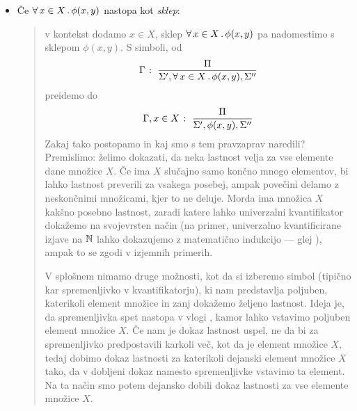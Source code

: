 \begin{itemize}
\begin{itemize}
\begin{quote}
					\end{quote}
				\item
					Če $\xall{x}[X]{\phi(x, y)}$ nastopa kot \emph{sklep}:
					\begin{quote}
						v kontekst dodamo $x \in X$, sklep $\xall{x}[X]{\phi(x, y)}$ pa nadomestimo s sklepom $\phi(x, y)$. S simboli, od
						\[\claim{\Gamma}{\Pi}{\Sigma', \xall{x}[X]{\phi(x, y)}, \Sigma''}\]
						preidemo do
						\[{\Gamma, x \in X} \;\colon\; \frac{\Pi}{\Sigma', \phi(x, y), \Sigma''}\]
						Zakaj tako postopamo in kaj smo s tem pravzaprav naredili? Premislimo: želimo dokazati, da neka lastnost velja za vse elemente dane množice $X$. Če ima $X$ slučajno samo končno mnogo elementov, bi lahko lastnost preverili za vsakega posebej, ampak povečini delamo z neskončnimi množicami, kjer to ne deluje. Morda ima množica $X$ kakšno posebno lastnost, zaradi katere lahko univerzalni kvantifikator dokažemo na svojevrsten način (na primer, univerzalno kvantificirane izjave na $\mathbb{N}$ lahko dokazujemo z matematično indukcijo --- glej ), ampak to se zgodi v izjemnih primerih.
						
						V splošnem nimamo druge možnosti, kot da si izberemo simbol (tipično kar spremenljivko v kvantifikatorju), ki nam predstavlja poljuben, katerikoli element množice in zanj dokažemo željeno lastnost. Ideja je, da spremenljivka spet nastopa v vlogi , kamor lahko vstavimo poljuben element množice $X$. Če nam je dokaz lastnost uspel, ne da bi za spremenljivko predpostavili karkoli več, kot da je element množice $X$, tedaj dobimo dokaz lastnosti za katerikoli dejanski element množice $X$ tako, da v dobljeni dokaz namesto spremenljivke vstavimo ta element. Na ta način smo potem dejansko dobili dokaz lastnosti za vse elemente množice $X$.
						

\end{quote}
\end{itemize}
\end{itemize}
